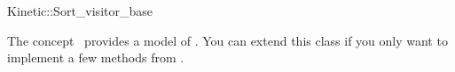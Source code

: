 

\begin{ccRefClass}{Kinetic::Sort_visitor_base}


\ccDefinition
  
The concept \ccRefName\ provides a model of
. You can extend this class if you only
want to implement a few methods from .

\ccIsModel


\ccCreation
{}  %


\ccSeeAlso



\end{ccRefClass}


